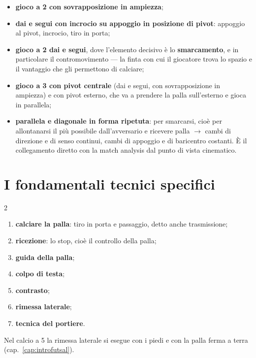 \begin{itemize}
  \item \textbf{gioco a 2 con sovrapposizione in ampiezza};
  \item \textbf{dai e segui con incrocio su appoggio in posizione di pivot}: appoggio al pivot,
    incrocio, tiro in porta;
  \item \textbf{gioco a 2 dai e segui}, dove l'elemento decisivo è lo \textbf{smarcamento}, e in
    particolare il contromovimento --- la finta con cui il giocatore trova lo spazio e il vantaggio
    che gli permettono di calciare;
  \item \textbf{gioco a 3 con pivot centrale} (dai e segui, con sovrapposizione in ampiezza) e con
    pivot esterno, che va a prendere la palla sull'esterno e gioca in parallela;
  \item \textbf{parallela e diagonale in forma ripetuta}: per smarcarsi, cioè per allontanarsi il
    più possibile dall'avversario e ricevere palla $\rightarrow$ cambi di direzione e di senso
    continui, cambi di appoggio e di baricentro costanti. È il collegamento diretto con la match
    analysis dal punto di vista cinematico.
\end{itemize}

\section{I fondamentali tecnici specifici}

\begin{multicols}{2}
\begin{enumerate}
  \item \textbf{calciare la palla}: tiro in porta e passaggio, detto anche trasmissione;
  \item \textbf{ricezione}: lo stop, cioè il controllo della palla;
  \item \textbf{guida della palla};
  \item \textbf{colpo di testa};
  \item \textbf{contrasto};
  \item \textbf{rimessa laterale};
  \item \textbf{tecnica del portiere}.
\end{enumerate}
\end{multicols}
Nel calcio a 5 la rimessa laterale si esegue con i piedi e con la palla ferma a terra
(cap.~\ref{cap:introfutsal}).

